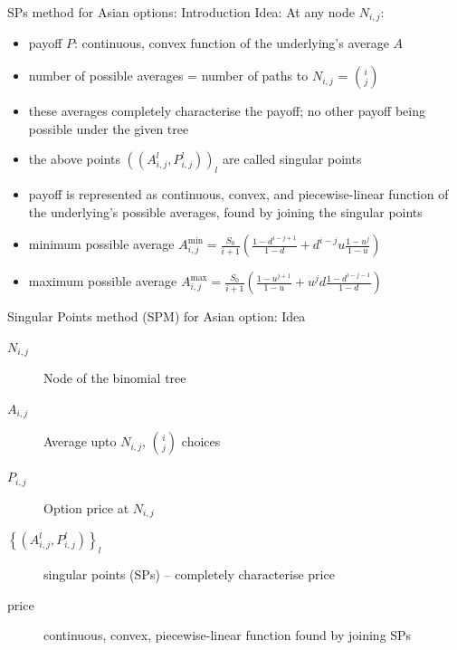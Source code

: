 \documentclass[utf8,t,xcolor=svgnames]{beamer}
\begin{document}
\begin{frame}{SPs method for Asian options: Introduction}
	Idea: At any node $ N_{i,j} $:
	\begin{itemize}
		\item payoff $ P $: continuous, convex function of the underlying's average $ A $
		\item number of possible averages = number of paths to $ N_{i,j} $ = $ \binom{i}{j} $
		\item these averages completely characterise the payoff; no other payoff being possible under the given tree
		\item the above points $ ((A_{i,j}^l, P_{i,j}^l))_l $ are called \alert{singular points}
		\item payoff is represented as continuous, convex, and piecewise-linear function of the underlying's possible averages, found by joining the singular points
		\item minimum possible average $ A_{i,j}^{\min} = \frac{S_0}{i+1} \left( \frac{1 - d^{i-j+1}}{1-d} + d^{i-j} u \frac{1 - u^{j}}{1-u} \right)$
		\item maximum possible average $ A_{i,j}^{\max} = \frac{S_0}{i+1} \left( \frac{1 - u^{j+1}}{1-u} + u^{j} d \frac{1 - d^{i-j-1}}{1-d} \right) $
	\end{itemize}
\end{frame}


\begin{frame}{Singular Points method (SPM) for Asian option: Idea}
	\begin{description}
		\item[$ N_{i,j} $] Node of the binomial tree
		\item[$ A_{i,j} $] Average upto $ N_{i,j} $, $ \binom{i}{j} $ choices
		\item[$ P_{i,j} $] Option price at $ N_{i,j} $
		\item[$ \left\lbrace \left( A_{i,j}^l, P_{i,j}^l \right) \right\rbrace_l $] \alert{singular points} (SPs) -- completely characterise price
		\item[price] continuous, convex, piecewise-linear function found by joining SPs
	\end{description}
\end{frame}
\end{document}
